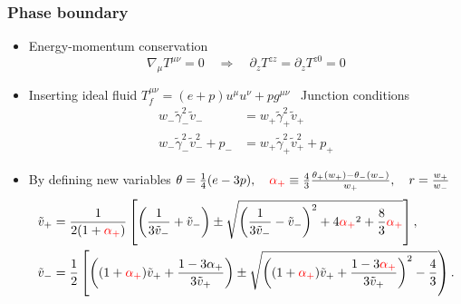 \begin{frame}
    \frametitle{Phase boundary}
    \begin{itemize}
        \item Energy-momentum conservation
        \begin{equation}
            \nabla_\mu T^{\mu\nu} = 0
            \quad \Rightarrow \quad
            \partial_z T^{zz} = \partial_z T^{z0} = 0
        \end{equation}
        \item Inserting ideal fluid $T^{\mu \nu}_f = (e+p) u^\mu u^\nu + p g^{\mu \nu}$ \textrightarrow \ Junction conditions
        \begin{align}
            w_- \tilde{\gamma}_-^2 \tilde{v}_- &= w_+ \tilde{\gamma}_+^2 \tilde{v}_+
            \label{eq:junction_condition_1} \\
            w_- \tilde{\gamma}_-^2 \tilde{v}_-^2 + p_- &= w_+ \tilde{\gamma}_+^2 \tilde{v}_+^2 + p_+
            \label{eq:junction_condition_2}
        \end{align}
        \item By defining new variables $\theta = \frac{1}{4}(e-3p), \quad \textcolor{red}{\alpha_+} \equiv \frac{4}{3} \frac{\theta_+(w_+) - \theta_-(w_-)}{w_+}, \quad r = \frac{w_+}{w_-}$
        \begin{align}
            \tilde{v}_+ &= \frac{1}{2(1+\textcolor{red}{\alpha_+})}\left[ \left(\frac{1}{3\tilde{v}_-}+\tilde{v}_-\right) \pm \sqrt{\left(\frac{1}{3\tilde{v}_-} - \tilde{v}_- \right)^2 + 4\textcolor{red}{\alpha_+}^2 + \frac{8}{3} \textcolor{red}{\alpha_+}} \right],
            \label{eq:v_tilde_plus}
            \\
            \tilde{v}_- &= \frac{1}{2} \left[ \left( (1+\textcolor{red}{\alpha_+})\tilde{v}_+ + \frac{1-3\alpha_+}{3\tilde{v}_+} \right) \pm \sqrt{\left((1+\textcolor{red}{\alpha_+})\tilde{v}_+ + \frac{1-3\textcolor{red}{\alpha_+}}{3\tilde{v}_+} \right)^2 - \frac{4}{3}} \right).
            \label{eq:v_tilde_minus}
        \end{align}
    \end{itemize}
\end{frame}

